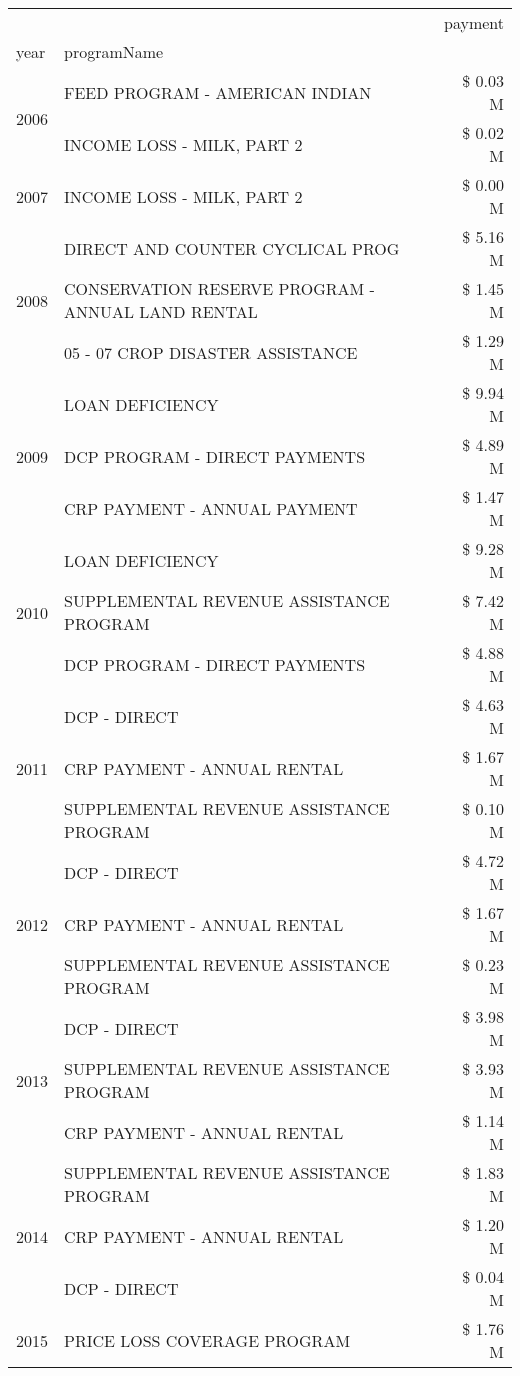 \begin{tabular}{llr}
\toprule
 &  & payment \\
year & programName &  \\
\midrule
\multirow[t]{2}{*}{2006} & FEED PROGRAM - AMERICAN INDIAN & \$ 0.03 M \\
 & INCOME LOSS - MILK, PART 2 & \$ 0.02 M \\
\cline{1-3}
2007 & INCOME LOSS - MILK, PART 2 & \$ 0.00 M \\
\cline{1-3}
\multirow[t]{3}{*}{2008} & DIRECT AND COUNTER CYCLICAL PROG & \$ 5.16 M \\
 & CONSERVATION RESERVE PROGRAM - ANNUAL LAND RENTAL & \$ 1.45 M \\
 & 05 - 07 CROP DISASTER ASSISTANCE & \$ 1.29 M \\
\cline{1-3}
\multirow[t]{3}{*}{2009} & LOAN DEFICIENCY & \$ 9.94 M \\
 & DCP PROGRAM - DIRECT PAYMENTS & \$ 4.89 M \\
 & CRP PAYMENT - ANNUAL PAYMENT & \$ 1.47 M \\
\cline{1-3}
\multirow[t]{3}{*}{2010} & LOAN DEFICIENCY & \$ 9.28 M \\
 & SUPPLEMENTAL REVENUE ASSISTANCE PROGRAM & \$ 7.42 M \\
 & DCP PROGRAM - DIRECT PAYMENTS & \$ 4.88 M \\
\cline{1-3}
\multirow[t]{3}{*}{2011} & DCP - DIRECT & \$ 4.63 M \\
 & CRP PAYMENT - ANNUAL RENTAL & \$ 1.67 M \\
 & SUPPLEMENTAL REVENUE ASSISTANCE PROGRAM & \$ 0.10 M \\
\cline{1-3}
\multirow[t]{3}{*}{2012} & DCP - DIRECT & \$ 4.72 M \\
 & CRP PAYMENT - ANNUAL RENTAL & \$ 1.67 M \\
 & SUPPLEMENTAL REVENUE ASSISTANCE PROGRAM & \$ 0.23 M \\
\cline{1-3}
\multirow[t]{3}{*}{2013} & DCP - DIRECT & \$ 3.98 M \\
 & SUPPLEMENTAL REVENUE ASSISTANCE PROGRAM & \$ 3.93 M \\
 & CRP PAYMENT - ANNUAL RENTAL & \$ 1.14 M \\
\cline{1-3}
\multirow[t]{3}{*}{2014} & SUPPLEMENTAL REVENUE ASSISTANCE PROGRAM & \$ 1.83 M \\
 & CRP PAYMENT - ANNUAL RENTAL & \$ 1.20 M \\
 & DCP - DIRECT & \$ 0.04 M \\
\cline{1-3}
\multirow[t]{3}{*}{2015} & PRICE LOSS COVERAGE PROGRAM & \$ 1.76 M \\

\end{tabular}
